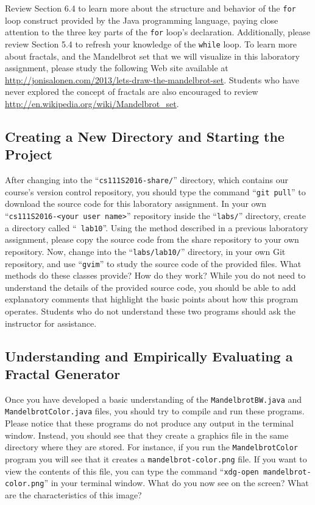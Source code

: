 Review Section 6.4 to learn more about the structure and behavior of the {\tt for} loop construct provided by the Java
programming language, paying close attention to the three key parts of the {\tt for} loop's declaration.  Additionally,
please review Section 5.4 to refresh your knowledge of the {\tt while} loop. To learn more about fractals, and the
Mandelbrot set that we will visualize in this laboratory assignment, please study the following Web site available at
\url{http://jonisalonen.com/2013/lets-draw-the-mandelbrot-set}.  Students who have never explored the concept of
fractals are also encouraged to review \url{http://en.wikipedia.org/wiki/Mandelbrot_set}.

\vspace{-0.1in}
\subsection*{Creating a New Directory and Starting the Project}
\vspace{-0.05in}

After changing into the ``{\tt cs111S2016-share/}'' directory, which contains our course's version control repository,
you should type the command ``{\tt git pull}'' to download the source code for this laboratory assignment.  In your own
``{\tt cs111S2016-<your user name>}'' repository inside the ``{\tt labs/}'' directory, create a directory called ``{\tt
  lab10}''. Using the method described in a previous laboratory assignment, please copy the source code from the share
repository to your own repository. Now, change into the ``{\tt labs/lab10/}'' directory, in your own Git repository, and
use ``{\tt gvim}'' to study the source code of the provided files. What methods do these classes provide? How do they
work? While you do not need to understand the details of the provided source code, you should be able to add explanatory
comments that highlight the basic points about how this program operates. Students who do not understand these two programs
should ask the instructor for assistance.

\vspace{-0.1in}
\subsection*{Understanding and Empirically Evaluating a Fractal Generator}
\vspace{-0.05in}

Once you have developed a basic understanding of the {\tt MandelbrotBW.java} and {\tt MandelbrotColor.java} files, you
should try to compile and run these programs. Please notice that these programs do not produce any output in the
terminal window.  Instead, you should see that they create a graphics file in the same directory where they are stored.
For instance, if you run the {\tt MandelbrotColor} program you will see that it creates a {\tt mandelbrot-color.png}
file.  If you want to view the contents of this file, you can type the command ``{\tt xdg-open mandelbrot-color.png}''
in your terminal window.  What do you now see on the screen? What are the characteristics of this image?

